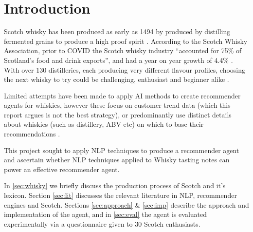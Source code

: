 \section{Introduction}\label{sec:intro}
Scotch whisky has been produced as early as 1494 by produced by distilling fermented grains to produce
a high proof spirit \cite{Jacques2003, Pyke1965}.
According to the Scotch Whisky Association, prior to COVID the Scotch whisky industry ``accounted for 75\% of 
Scotland's food and drink exports'', and had a year on year growth of 4.4\% \cite{swa2, swa}.
With over 130 distilleries, each producing very different flavour profiles, choosing the next whisky to try 
could be challenging, enthusiast and beginner alike \cite{n_distilleries, powell_2021}.

Limited attempts have been made to apply AI methods to create recommender agents for whiskies,
however these focus on customer trend data (which this report argues is not the best strategy), or predominantly
use distinct details about whiskies (such as distillery, ABV etc) on which to base their recommendations
\cite{Omidzohoor, Coldevin2005}.

This project sought to apply NLP techniques to produce a recommender agent and ascertain whether
NLP techniques applied to Whisky tasting notes can power an effective recommender agent.  

In \autoref{sec:whisky} we briefly discuss the production process of Scotch and it's lexicon. Section 
\ref{sec:lit} discusses the relevant literature in NLP, recommender engines and Scotch. Sections 
\ref{sec:approach} \& \ref{sec:imp} describe the approach and implementation of the agent, and in 
\autoref{sec:eval} the agent is evaluated experimentally via a questionnaire given to 30 Scotch enthusiasts.